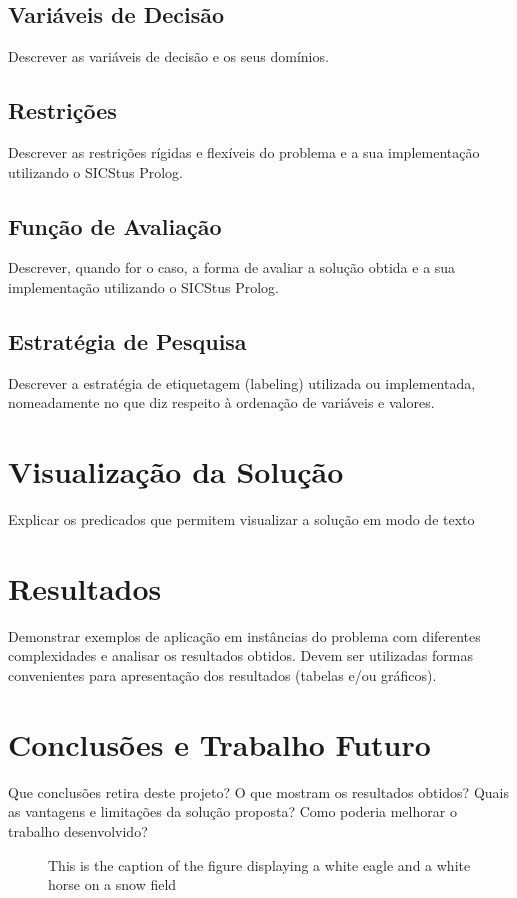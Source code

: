 \documentclass{llncs}
\begin{document}
\subsection{Variáveis de Decisão}
Descrever as variáveis de decisão e os seus domínios.

\subsection{Restrições}
 Descrever as restrições rígidas e flexíveis do problema e a sua implementação utilizando o SICStus Prolog.

\subsection{ Função de Avaliação}
Descrever, quando for o caso, a forma de avaliar a solução obtida e a sua implementação utilizando o SICStus Prolog.

\subsection{Estratégia de Pesquisa}
Descrever a estratégia de etiquetagem
(labeling) utilizada ou implementada, nomeadamente no que diz respeito à ordenação
de variáveis e valores.

\section{Visualização da Solução}
Explicar os predicados que permitem visualizar a solução em modo de texto

\section{Resultados}
Demonstrar exemplos de aplicação em instâncias do problema com
diferentes complexidades e analisar os resultados obtidos. Devem ser utilizadas formas
convenientes para apresentação dos resultados (tabelas e/ou gráficos).

\section{Conclusões e Trabalho Futuro}
 Que conclusões retira deste projeto? O que mostram os resultados obtidos? Quais as vantagens e limitações da
solução proposta? Como poderia melhorar o trabalho desenvolvido?

\begin{figure}
\vspace{2.5cm}
\caption{This is the caption of the figure displaying a white eagle and
a white horse on a snow field}
\end{figure}
\end{document}
